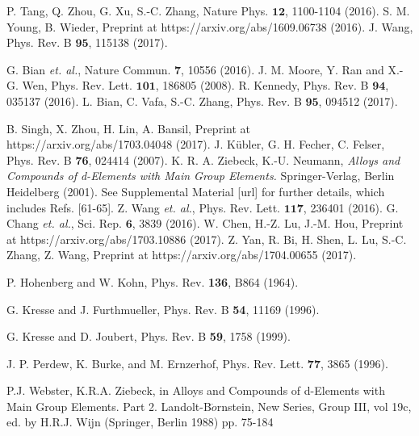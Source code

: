 \documentclass[aps,prl,superscriptaddress,twocolumn,showpacs]{revtex4-1}
\begin{document}
\begin{thebibliography}{99}
 P. Tang, Q. Zhou, G. Xu, S.-C. Zhang, Nature Phys. $\mathbf{12}$, 1100-1104 (2016).
 S. M. Young, B. Wieder, Preprint at https://arxiv.org/abs/1609.06738 (2016).
 J. Wang, Phys. Rev. B $\mathbf{95}$, 115138 (2017).



 G. Bian \textit{et. al.}, Nature Commun. \textbf{7}, 10556 (2016).
 J. M. Moore, Y. Ran and X.-G. Wen, Phys. Rev. Lett. $\mathbf{101}$, 186805 (2008).
 R. Kennedy, Phys. Rev. B $\mathbf{94}$, 035137 (2016).
 L. Bian, C. Vafa, S.-C. Zhang, Phys. Rev. B $\mathbf{95}$, 094512 (2017).

 B. Singh, X. Zhou, H. Lin, A. Bansil, Preprint at https://arxiv.org/abs/1703.04048 (2017).
 J. K\"ubler, G. H. Fecher, C. Felser, Phys. Rev. B \textbf{76}, 024414 (2007).
 K. R. A. Ziebeck, K.-U. Neumann, \textit{Alloys and Compounds of d-Elements with Main Group Elements.} Springer-Verlag, Berlin Heidelberg (2001).
See Supplemental Material [url] for further details, which includes
Refs. [61-65].
 Z. Wang \textit{et. al.}, Phys. Rev. Lett. $\mathbf{117}$, 236401 (2016).
 G. Chang \textit{et. al.}, Sci. Rep. $\mathbf{6}$, 3839 (2016).
 W. Chen, H.-Z. Lu, J.-M. Hou, Preprint at https://arxiv.org/abs/1703.10886 (2017).
 Z. Yan, R. Bi, H. Shen, L. Lu, S.-C. Zhang, Z. Wang, Preprint at https://arxiv.org/abs/1704.00655 (2017).



P. Hohenberg and W. Kohn, Phys. Rev. \textbf{136}, B864 (1964).

 G.  Kresse and J. Furthmueller, Phys. Rev. B \textbf{54}, 11169 (1996).

G. Kresse and D. Joubert, Phys. Rev. B \textbf{59}, 1758 (1999).

J. P. Perdew, K. Burke, and M. Ernzerhof, Phys. Rev. Lett. \textbf{77}, 3865 (1996).

P.J. Webster, K.R.A. Ziebeck, in Alloys and Compounds of d-Elements with Main Group
Elements. Part 2. Landolt-B$\ddot{o}$rnstein, New Series, Group III, vol 19c, ed. by H.R.J. Wijn
(Springer, Berlin 1988)  pp. 75-184


\end{thebibliography}
\end{document}
